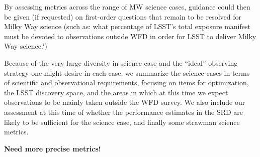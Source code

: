 By assessing metrics across the range of MW science cases, guidance
could then be given (if requested) on first-order questions that remain
to be resolved for Milky Way science (such as: what percentage of
LSST's total exposure manifest must be devoted to observations outside
WFD in order for LSST to deliver Milky Way science?)




Because of the very large diversity in science case and the ``ideal''
observing strategy one might desire in each case, we summarize the
science cases in terms of scientific and observational requirements,
focusing on items for optimization, the LSST discovery space, and the
areas in which at this time we expect observations to be mainly taken
outside the WFD survey. We also include our assessment at this time of
whether the performance estimates in the SRD are likely to be
sufficient for the science case, and finally some strawman science
metrics.

{\bf Need more precise metrics!}

\navigationbar



